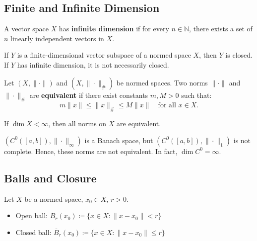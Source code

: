 \subsection{Finite and Infinite Dimension}

\begin{definition}
A vector space \( X \) has \textbf{infinite dimension} if for every \( n \in \mathbb{N} \), there exists a set of \( n \) linearly independent vectors in \( X \).
\end{definition}

\begin{remark}
If \( Y \) is a finite-dimensional vector subspace of a normed space \( X \), then \( Y \) is closed. If \( Y \) has infinite dimension, it is not necessarily closed.
\end{remark}

\begin{definition}
Let \( (X, \|\cdot\|) \) and \( (X, \|\cdot\|_\#) \) be normed spaces. Two norms \( \|\cdot\| \) and \( \|\cdot\|_\# \) are \textbf{equivalent} if there exist constants \( m, M > 0 \) such that:
\[
m \|x\| \leq \|x\|_\# \leq M \|x\| \quad \text{for all } x \in X.
\]
\end{definition}

\begin{theorem}
If \( \dim X < \infty \), then all norms on \( X \) are equivalent.
\end{theorem}

\begin{remark}
\( (C^0([a,b]), \|\cdot\|_\infty) \) is a Banach space, but \( (C^0([a,b]), \|\cdot\|_1) \) is not complete. Hence, these norms are not equivalent. In fact, \( \dim C^0 = \infty \).
\end{remark}

\clearpage
\subsection{Balls and Closure}

Let \( X \) be a normed space, \( x_0 \in X \), \( r > 0 \).

\begin{itemize}
    \item Open ball: \( B_r(x_0) \coloneqq \{ x \in X : \|x - x_0\| < r \} \)
    \item Closed ball: \( \overline{B}_r(x_0) \coloneqq \{ x \in X : \|x - x_0\| \leq r \} \)
\end{itemize}

